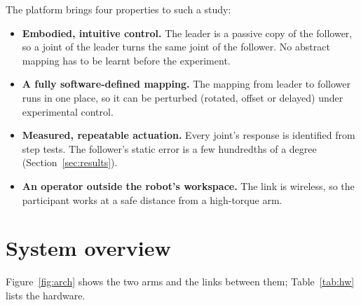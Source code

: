 \documentclass[11pt,a4paper]{article}
\begin{document}
The platform brings four properties to such a study:
\begin{itemize}
\item \textbf{Embodied, intuitive control.} The leader is a passive copy of the follower, so a joint of the
      leader turns the same joint of the follower. No abstract mapping has to be learnt before the experiment.
\item \textbf{A fully software-defined mapping.} The mapping from leader to follower runs in one place, so it
      can be perturbed (rotated, offset or delayed) under experimental control.
\item \textbf{Measured, repeatable actuation.} Every joint's response is identified from step tests. The
      follower's static error is a few hundredths of a degree (Section~\ref{sec:results}).
\item \textbf{An operator outside the robot's workspace.} The link is wireless, so the participant works at a
      safe distance from a high-torque arm.
\end{itemize}

\section{System overview}

Figure~\ref{fig:arch} shows the two arms and the links between them; Table~\ref{tab:hw} lists the hardware.
\end{document}
